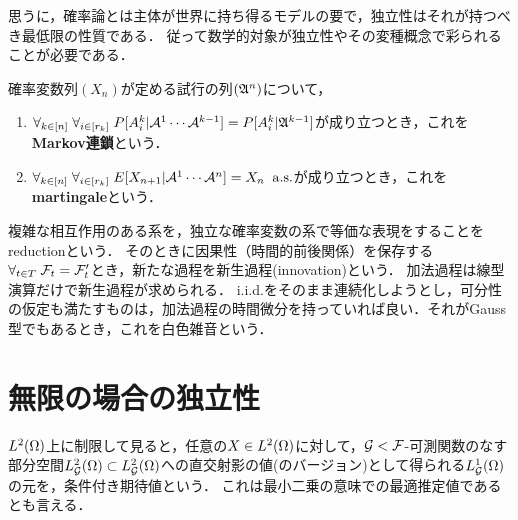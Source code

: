 \documentclass[uplatex,dvipdfmx]{jsreport}
\begin{document}
\begin{tcolorbox}[colframe=ForestGreen, colback=ForestGreen!10!white,breakable,colbacktitle=ForestGreen!40!white,coltitle=black,fonttitle=\bfseries\sffamily,
title=]
    思うに，確率論とは主体が世界に持ち得るモデルの要で，独立性はそれが持つべき最低限の性質である．
    従って数学的対象が独立性やその変種概念で彩られることが必要である．
\end{tcolorbox}

\begin{definition}
    確率変数列$(X_n)$が定める試行の列$(\mathfrak{A}^n)$について，
    \begin{enumerate}
        \item $\forall_{k\in[n]}\;\forall_{i\in[r_k]}\;P[A_i^k|\mathcal{A}^1\cdots\mathcal{A}^{k-1}]=P[A^k_i|\mathfrak{A}^{k-1}]$が成り立つとき，これを\textbf{Markov連鎖}という．
        \item $\forall_{k\in[n]}\;\forall_{i\in[r_k]}\;E[X_{n+1}|\mathcal{A}^1\cdots\mathcal{A}^n]=X_n\;\;\mathrm{a.s.}$が成り立つとき，これを\textbf{martingale}という．
    \end{enumerate}
\end{definition}

\begin{remark}[確率解析の精神]
    複雑な相互作用のある系を，独立な確率変数の系で等価な表現をすることを
    reductionという．
    そのときに因果性（時間的前後関係）を保存する$\forall_{t\in T}\;\mathcal{F}_t=\mathcal{F}'_t$とき，新たな過程を新生過程(innovation)という．
    加法過程は線型演算だけで新生過程が求められる．
    i.i.d.をそのまま連続化しようとし，可分性の仮定も満たすものは，加法過程の時間微分を持っていれば良い．それがGauss型でもあるとき，これを白色雑音という．
\end{remark}


\section{無限の場合の独立性}

\begin{tcolorbox}[colframe=ForestGreen, colback=ForestGreen!10!white,breakable,colbacktitle=ForestGreen!40!white,coltitle=black,fonttitle=\bfseries\sffamily,
title=]
    $L^2(\Omega)$上に制限して見ると，任意の$X\in L^2(\Omega)$に対して，$\mathcal{G}<\mathcal{F}$-可測関数のなす部分空間$L_{\mathcal{G}}^2(\Omega)\subset L_{\mathcal{G}}^2(\Omega)$への直交射影の値(のバージョン)として得られる$L_{\mathcal{G}}^1(\Omega)$の元を，条件付き期待値という．
    これは最小二乗の意味での最適推定値であるとも言える．
\end{tcolorbox}
\end{document}
